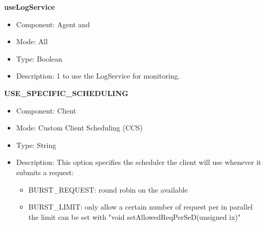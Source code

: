 \begin{description}
\item{\bf{useLogService}}
  \begin{itemize}
  \item Component: Agent and \sed
  \item Mode: All
  \item Type: Boolean
  \item Description: 1 to use the LogService for monitoring.
  \end{itemize}

\item{\bf{USE\_SPECIFIC\_SCHEDULING}}
  \begin{itemize}
  \item Component: Client
  \item Mode: Custom Client Scheduling (CCS)
  \item Type: String
  \item Description: 
    This option specifies the scheduler the client will use whenever it submits
    a request:
    \begin{itemize}
    \item BURST\_REQUEST: round robin on the available \sed
    \item BURST\_LIMIT: only allow a certain number of request per \sed in
      parallel the limit can be set with "void
      setAllowedReqPerSeD(unsigned ix)"
    \end{itemize}
  \end{itemize}






\end{description}






